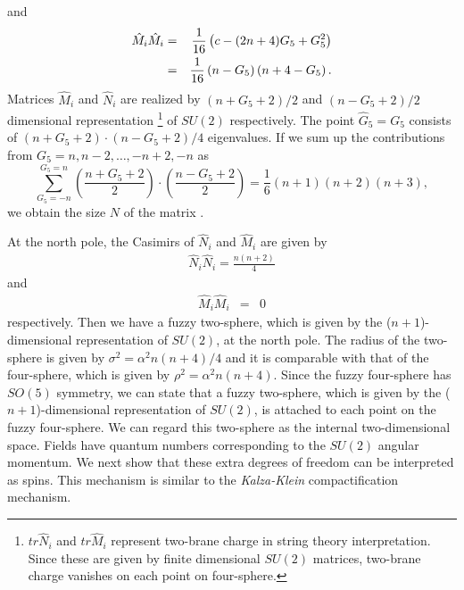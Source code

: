 \documentclass[a4paper,11pt]{article}
\begin{document}
and 
\begin{eqnarray}
\hat{M}_{i}\hat{M}_{i}
&=&\frac{1}{16}\left(
c-(2n+4)G_{5}+G_{5}^{2}\right) \cr
&=&\frac{1}{16}\left(
n-G_{5}\right)\left( n+4-G_{5}\right). 
\end{eqnarray}
Matrices 
$\hat{M}_{i}$ and $\hat{N}_{i}$ are realized by 
$(n+G_{5}+2)/2$ and $(n-G_{5}+2)/2$ dimensional 
representation
\footnote{$tr\hat{N}_{i}$ and $tr\hat{M}_{i}$ represent 
two-brane charge in string theory interpretation. 
Since these are given by finite dimensional 
$SU(2)$ matrices, 
two-brane charge vanishes on each point on four-sphere. 
} of $SU(2)$ 
respectively. 
The point $\hat{G}_{5}=G_{5}$ consists of 
$(n+G_{5}+2)\cdot (n-G_{5}+2)/4$ eigenvalues. 
If we sum up the contributions 
from $G_{5}=n,n-2,\ldots,-n+2,-n$ as 
\begin{equation}
\sum_{G_{5}=-n}^{G_{5}=n}\left(\frac{n+G_{5}+2}{2} \right)
\cdot \left(\frac{n-G_{5}+2}{2}\right)  
=\frac{1}{6}(n+1)(n+2)(n+3), 
\end{equation}
we obtain the size $N$ of the matrix .  

At the north pole, the Casimirs of $\hat{N}_{i}$ and $\hat{M}_{i}$ 
are given by 
\begin{eqnarray}
\hat{N}_{i}\hat{N}_{i}
=\frac{n(n+2)}{4}
\label{Ncasimirnorth}
\end{eqnarray}
and 
\begin{eqnarray}
\hat{M}_{i}\hat{M}_{i}
&=&0 
\label{Mcasimirnorth}
\end{eqnarray}
respectively. 
Then we have a fuzzy two-sphere, 
which is given by the ($n+1$)-dimensional representation 
of $SU(2)$, at the north pole. 
The radius of the two-sphere is given by 
$\sigma^{2}=\alpha^{2}n(n+4)/4$ and it
is comparable with that of the four-sphere, 
which is given by $\rho^{2}=\alpha^{2}n(n+4)$. 
Since the fuzzy four-sphere has $SO(5)$ symmetry, 
we can state that a fuzzy two-sphere, which is given by 
the ($n+1$)-dimensional representation of $SU(2)$, 
is attached to each point on the fuzzy four-sphere. 
We can regard this two-sphere as the internal two-dimensional space. 
Fields have quantum numbers corresponding to the $SU(2)$ angular 
momentum. 
We next show that these extra degrees of freedom can be 
interpreted as spins.  
This mechanism is similar 
to the {\it Kalza-Klein} compactification mechanism. 
\end{document}

